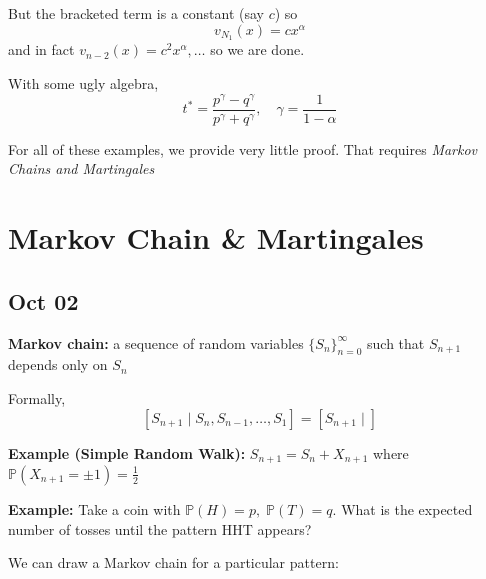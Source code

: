 \documentclass[12pt]{report}
\renewcommand{\P}{\mathbb{P}}
\begin{document}
        But the bracketed term is a constant (say $c$) so 
        \[v_{N_1}(x) = cx^{\alpha}\]
        and in fact $v_{n-2}(x) = c^2x^{\alpha}, \dots$ so we are done. 

        With some ugly algebra, 
        \[t^* = \frac{p^{\gamma} - q^{\gamma}}{p^{\gamma} + q^{\gamma}}, \quad \gamma = \frac{1}{1 - \alpha}\]

        For all of these examples, we provide very little proof. That requires \emph{Markov Chains and Martingales}

\chapter{Markov Chain \& Martingales}
\section{Oct 02}
    \textbf{Markov chain:} a sequence of random variables $\{S_n\}_{n=0}^{\infty}$ such that $S_{n+1}$ depends only on $S_n$ 

    \begin{center}
    \end{center}

    Formally, 
    \[[S_{n+1} \; | \; S_n, S_{n-1}, \dots, S_1] = [S_{n+1} \; | \; ]\]

    \textbf{Example (Simple Random Walk):} $S_{n+1} = S_n + X_{n+1}$ where $\P(X_{n+1} = \pm 1) = \frac{1}{2}$ 
    
    \textbf{Example:} Take a coin with $\P(H) = p, \; \P(T) = q$. What is the expected number of tosses until the pattern HHT appears? 

    We can draw a Markov chain for a particular pattern: 
\end{document}
